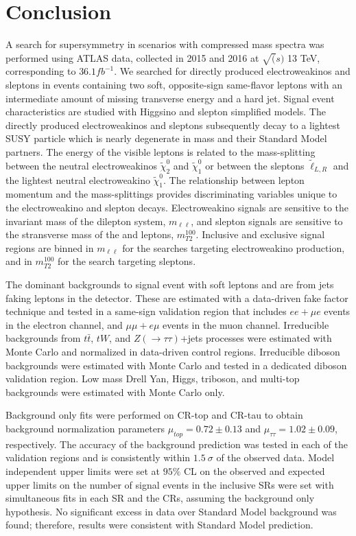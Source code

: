 \chapter{Conclusion}
\label{ch:conclusion}
A search for supersymmetry in scenarios with compressed mass spectra was performed using ATLAS data, collected in 2015 and 2016 at $\sqrt(s)$ 13 TeV, corresponding to $36.1 fb^{-1}$. %
We searched for directly produced electroweakinos and sleptons in events containing two soft, opposite-sign same-flavor leptons with an intermediate amount of missing transverse energy and a hard jet.  Signal event characteristics are studied with Higgsino and slepton simplified models.  The directly produced electroweakinos and sleptons subsequently decay to a lightest SUSY particle which is nearly degenerate in mass and their Standard Model partners.  The energy of the visible leptons is related to the mass-splitting between the neutral electroweakinos $\tilde\chi_2^0$ and $\tilde\chi_1^0$ or between the sleptons $\tilde\ell_{L,R}$ and the lightest neutral electroweakino $\tilde\chi_1^0$.  The relationship between lepton momentum and the mass-splittings provides discriminating variables unique to the electroweakino and slepton decays.  Electroweakino signals are sensitive to the invariant mass of the dilepton system, $m_{\ell\ell}$, and slepton signals are sensitive to the stransverse mass of the \met and leptons, $m_{T2}^{100}$.  Inclusive and exclusive signal regions are binned in $m_{\ell\ell}$ for the searches targeting electroweakino production, and in $m_{T2}^{100}$ for the search targeting sleptons.
 
The dominant backgrounds to signal event with soft leptons and \met are from jets faking leptons in the detector.  These are estimated with a data-driven fake factor technique and tested in a same-sign validation region that includes $ee+\mu e$ events in the electron channel, and $\mu\mu+e\mu$ events in the muon channel.  Irreducible backgrounds from $t\bar t$, $tW$, and $Z(\rightarrow\tau\tau)$+jets processes were estimated with Monte Carlo and normalized in data-driven control regions.  Irreducible diboson backgrounds were estimated with Monte Carlo and tested in a dedicated diboson validation region.  Low mass Drell Yan, Higgs, triboson, and multi-top backgrounds were estimated with Monte Carlo only.

Background only fits were performed on CR-top and CR-tau to obtain background normalization parameters $\mu_{top} =0.72\pm0.13$ and $\mu_{\tau\tau}=1.02\pm0.09$, respectively.  The accuracy of the background prediction was tested in each of the validation regions and is consistently within $1.5~\sigma$ of the observed data.  Model independent upper limits were set at $95\%$ CL on the observed and expected upper limits on the number of signal events in the inclusive SRs were set with simultaneous fits in each SR and the CRs, assuming the background only hypothesis.  No significant excess in data over Standard Model background was found; therefore, results were consistent with Standard Model prediction. 


